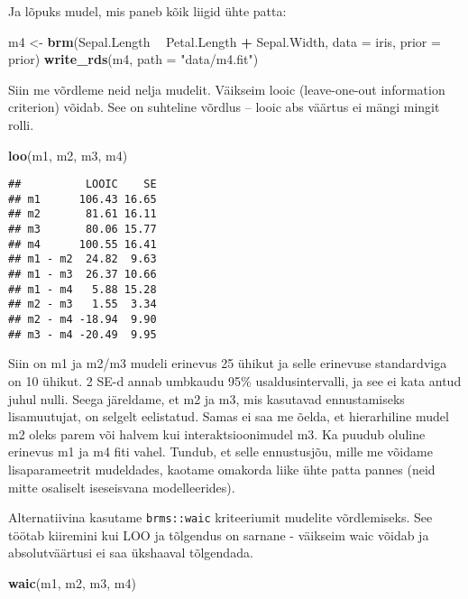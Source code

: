 \documentclass[]{article}
\newenvironment{Shaded}{\begin{snugshade}}{\end{snugshade}}
\newcommand{\KeywordTok}[1]{\textcolor[rgb]{0.13,0.29,0.53}{\textbf{#1}}}
\newcommand{\DataTypeTok}[1]{\textcolor[rgb]{0.13,0.29,0.53}{#1}}
\newcommand{\StringTok}[1]{\textcolor[rgb]{0.31,0.60,0.02}{#1}}
\newcommand{\OperatorTok}[1]{\textcolor[rgb]{0.81,0.36,0.00}{\textbf{#1}}}
\newcommand{\NormalTok}[1]{#1}
\begin{document}
Ja lõpuks mudel, mis paneb kõik liigid ühte patta:

\begin{Shaded}
\begin{Highlighting}[]
\NormalTok{m4 <-}\StringTok{ }\KeywordTok{brm}\NormalTok{(Sepal.Length }\OperatorTok{~}\StringTok{ }\NormalTok{Petal.Length }\OperatorTok{+}\StringTok{ }\NormalTok{Sepal.Width, }
          \DataTypeTok{data =}\NormalTok{ iris, }
          \DataTypeTok{prior =}\NormalTok{ prior)}
\KeywordTok{write_rds}\NormalTok{(m4, }\DataTypeTok{path =} \StringTok{"data/m4.fit"}\NormalTok{)}
\end{Highlighting}
\end{Shaded}

Siin me võrdleme neid nelja mudelit. Väikseim looic (leave-one-out
information criterion) võidab. See on suhteline võrdlus -- looic abs
väärtus ei mängi mingit rolli.

\begin{Shaded}
\begin{Highlighting}[]
\KeywordTok{loo}\NormalTok{(m1, m2, m3, m4)}
\end{Highlighting}
\end{Shaded}

\begin{verbatim}
##          LOOIC    SE
## m1      106.43 16.65
## m2       81.61 16.11
## m3       80.06 15.77
## m4      100.55 16.41
## m1 - m2  24.82  9.63
## m1 - m3  26.37 10.66
## m1 - m4   5.88 15.28
## m2 - m3   1.55  3.34
## m2 - m4 -18.94  9.90
## m3 - m4 -20.49  9.95
\end{verbatim}

Siin on m1 ja m2/m3 mudeli erinevus 25 ühikut ja selle erinevuse
standardviga on 10 ühikut. 2 SE-d annab umbkaudu 95\% usaldusintervalli,
ja see ei kata antud juhul nulli. Seega järeldame, et m2 ja m3, mis
kasutavad ennustamiseks lisamuutujat, on selgelt eelistatud. Samas ei
saa me õelda, et hierarhiline mudel m2 oleks parem või halvem kui
interaktsioonimudel m3. Ka puudub oluline erinevus m1 ja m4 fiti vahel.
Tundub, et selle ennustusjõu, mille me võidame lisaparameetrit
mudeldades, kaotame omakorda liike ühte patta pannes (neid mitte
osaliselt iseseisvana modelleerides).

Alternatiivina kasutame \texttt{brms::waic} kriteeriumit mudelite
võrdlemiseks. See töötab kiiremini kui LOO ja tõlgendus on sarnane -
väikseim waic võidab ja absolutväärtusi ei saa ükshaaval tõlgendada.

\begin{Shaded}
\begin{Highlighting}[]
\KeywordTok{waic}\NormalTok{(m1, m2, m3, m4)}
\end{Highlighting}
\end{Shaded}
\end{document}
